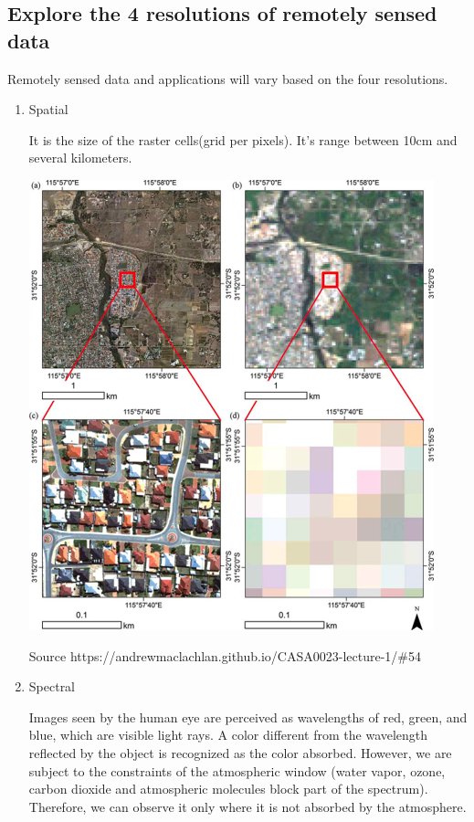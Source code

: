 \documentclass[
  letterpaper,
  DIV=11,
  numbers=noendperiod]{scrreprt}
\begin{document}
\hypertarget{explore-the-4-resolutions-of-remotely-sensed-data}{%
\subsection{Explore the 4 resolutions of remotely sensed
data}\label{explore-the-4-resolutions-of-remotely-sensed-data}}

Remotely sensed data and applications will vary based on the four
resolutions.

\begin{enumerate}
\def\labelenumi{\arabic{enumi}.}
\item
  Spatial

  It is the size of the raster cells(grid per pixels). It's range
  between 10cm and several kilometers.

  \includegraphics{./images/paste-69B7DCB3.png}

  Source https://andrewmaclachlan.github.io/CASA0023-lecture-1/\#54
\item
  Spectral

  Images seen by the human eye are perceived as wavelengths of red,
  green, and blue, which are visible light rays. A color different from
  the wavelength reflected by the object is recognized as the color
  absorbed. However, we are subject to the constraints of the
  atmospheric window (water vapor, ozone, carbon dioxide and atmospheric
  molecules block part of the spectrum). Therefore, we can observe it
  only where it is not absorbed by the atmosphere.


\end{enumerate}
\end{document}
